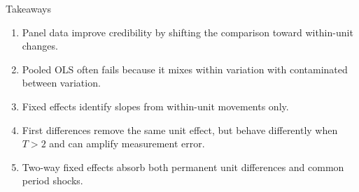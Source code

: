 \documentclass[10pt]{beamer}
\begin{document}
\begin{frame}{Takeaways}
\small
\begin{enumerate}
  \item Panel data improve credibility by shifting the comparison toward within-unit changes.
  \item Pooled OLS often fails because it mixes within variation with contaminated between variation.
  \item Fixed effects identify slopes from within-unit movements only.
  \item First differences remove the same unit effect, but behave differently when $T>2$ and can amplify measurement error.
  \item Two-way fixed effects absorb both permanent unit differences and common period shocks.
\end{enumerate}
\end{frame}
\end{document}
